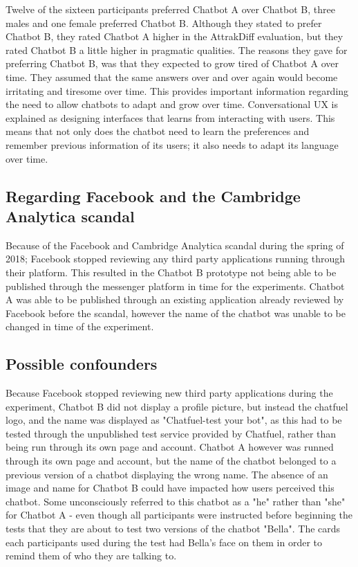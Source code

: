 Twelve of the sixteen participants preferred Chatbot A over Chatbot B, three males and one female preferred Chatbot B. Although they stated to prefer Chatbot B, they rated Chatbot A higher in the AttrakDiff evaluation, but they rated Chatbot B a little higher in pragmatic qualities. The reasons they gave for preferring Chatbot B, was that they expected to grow tired of Chatbot A over time. They assumed that the same answers over and over again would become irritating and tiresome over time. This provides important information regarding the need to allow chatbots to adapt and grow over time. Conversational UX is explained as designing interfaces that learns from interacting with users. This means that not only does the chatbot need to learn the preferences and remember previous information of its users; it also needs to adapt its language over time.

\subsection{Regarding Facebook and the Cambridge Analytica scandal}

Because of the Facebook and Cambridge Analytica scandal during the spring of 2018; Facebook stopped reviewing any third party applications running through their platform. This resulted in the Chatbot B prototype not being able to be published through the messenger platform in time for the experiments. Chatbot A was able to be published through an existing application already reviewed by Facebook before the scandal, however the name of the chatbot was unable to be changed in time of the experiment.

\subsection{Possible confounders}
Because Facebook stopped reviewing new third party applications during the experiment, Chatbot B did not display a profile picture, but instead the chatfuel logo, and the name was displayed as "Chatfuel-test your bot", as this had to be tested through the unpublished test service provided by Chatfuel, rather than being run through its own page and account. Chatbot A however was runned through its own page and account, but the name of the chatbot belonged to a previous version of a chatbot displaying the wrong name. The absence of an image and name for Chatbot B could have impacted how users perceived this chatbot. Some unconsciously referred to this chatbot as a "he" rather than "she" for Chatbot A - even though all participants were instructed before beginning the tests that they are about to test two versions of the chatbot "Bella". The cards each participants used during the test had Bella's face on them in order to remind them of who they are talking to. 

